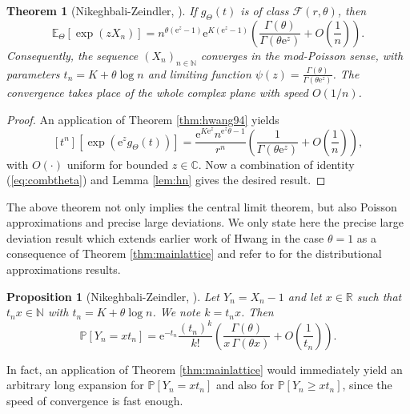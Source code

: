 \documentclass[12pt,a4paper,reqno]{amsart}
\newtheorem{theorem}[lemma]{Theorem}
\newtheorem{proposition}[lemma]{Proposition}
\theoremstyle{remark}
\newcommand{\N}{\mathbb{N}}
\newcommand{\C}{\mathbb{C}}
\newcommand{\E}{\mathrm{e}}
\newcommand{\esper}{\mathbb{E}}
\begin{document}
\begin{theorem}[Nikeghbali-Zeindler, \cite{NZ13}]
If $g_\Theta(t)$ is of class $\mathcal F(r,\theta)$, then
$$ \esper_{\Theta} [\exp(z X_n)]=n^{\theta(\E^z-1)} \E^{K(\E^z-1)}\left(\dfrac{\Gamma(\theta)}{\Gamma(\theta \E^z)}+O\!\left(\dfrac{1}{n}\right)\right).$$
Consequently, the sequence $(X_n)_{n \in \N}$ converges in the mod-Poisson sense, with parameters $t_n=K+\theta \log n$ and limiting function $\psi(z)=\frac{\Gamma(\theta)}{\Gamma(\theta \E^z)}$. The convergence takes place of the whole complex plane with speed $O(1/n)$.
\label{thm:modpoissonNZ}
\end{theorem}

\begin{proof}
An application of Theorem \ref{thm:hwang94} yields
$$[t^n][\exp(\E^z g_\Theta(t))]=\dfrac{\E^{K\E^z}n^{\E^z\theta-1}}{r^n}\left(\dfrac{1}{\Gamma(\theta \E^z)}+O\!\left(\dfrac{1}{n}\right)\right),$$
with $O(\cdot)$ uniform for bounded $z\in\C$. Now a combination of identity (\ref{eq:combtheta}) and Lemma \ref{lem:hn} gives the desired result.
\end{proof}
\bigskip

The above theorem not only implies the central limit theorem, but also Poisson approximations and precise large deviations. We only state here the precise large deviation result which extends earlier work of Hwang in the case $\theta=1$ as a consequence of Theorem \ref{thm:mainlattice} and refer to \cite{NZ13} for the distributional approximations results.

\begin{proposition}[Nikeghbali-Zeindler, \cite{NZ13}]
Let $Y_n=X_n-1$ and let $x\in\mathbb R$ such that $t_nx\in\mathbb N$ with $t_n=K+\theta \log n$. We note $k=t_n x$. Then
$$\mathbb P[Y_n=x t_n]=\E^{-t_n}\dfrac{(t_n)^k}{k!}\left(\dfrac{\Gamma(\theta)}{x\,\Gamma(\theta x)}+O\!\left(\dfrac{1}{ t_n}\right)\right).$$
\end{proposition}
\noindent In fact, an application of Theorem \ref{thm:mainlattice} would immediately yield an arbitrary long expansion for $\mathbb P[Y_n=x t_n]$ and also for $\mathbb P[Y_n\geq x t_n]$, since the speed of convergence is fast enough.
\bigskip
\end{document}
